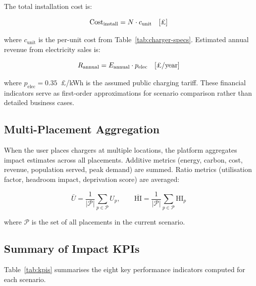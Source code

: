 The total installation cost is:

\begin{equation}
\label{eq:cost}
\text{Cost}_{\text{install}} = N \cdot c_{\text{unit}}
\quad [\text{\pounds}]
\end{equation}

\noindent where $c_{\text{unit}}$ is the per-unit cost from Table~\ref{tab:charger-specs}. Estimated annual revenue from electricity sales is:

\begin{equation}
\label{eq:revenue}
R_{\text{annual}} = E_{\text{annual}} \cdot p_{\text{elec}}
\quad [\text{\pounds/year}]
\end{equation}

\noindent where $p_{\text{elec}} = 0.35$~\pounds/kWh is the assumed public charging tariff. These financial indicators serve as first-order approximations for scenario comparison rather than detailed business cases.

\subsection{Multi-Placement Aggregation}
\label{sec:aggregation-impact}

When the user places chargers at multiple locations, the platform aggregates impact estimates across all placements. Additive metrics (energy, carbon, cost, revenue, population served, peak demand) are summed. Ratio metrics (utilisation factor, headroom impact, deprivation score) are averaged:

\begin{equation}
\bar{U} = \frac{1}{|\mathcal{P}|} \sum_{p \in \mathcal{P}} U_p, \qquad
\overline{\text{HI}} = \frac{1}{|\mathcal{P}|} \sum_{p \in \mathcal{P}} \text{HI}_p
\end{equation}

\noindent where $\mathcal{P}$ is the set of all placements in the current scenario.

\subsection{Summary of Impact KPIs}
\label{sec:kpi-summary}

Table~\ref{tab:kpis} summarises the eight key performance indicators computed for each scenario.

